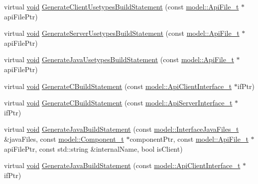 \begin{DoxyCompactItemize}
\item 
virtual \hyperlink{_t_e_m_p_l_a_t_e__cdef_8h_ac9c84fa68bbad002983e35ce3663c686}{void} \hyperlink{classninja_1_1_component_build_script_generator__t_a7f11f3f8ce13b373ea30b295c7c493f2}{Generate\+Client\+Usetypes\+Build\+Statement} (const \hyperlink{structmodel_1_1_api_file__t}{model\+::\+Api\+File\+\_\+t} $\ast$api\+File\+Ptr)
\item 
virtual \hyperlink{_t_e_m_p_l_a_t_e__cdef_8h_ac9c84fa68bbad002983e35ce3663c686}{void} \hyperlink{classninja_1_1_component_build_script_generator__t_a0fa0c9036a54a9bb08a2e18efdacd128}{Generate\+Server\+Usetypes\+Build\+Statement} (const \hyperlink{structmodel_1_1_api_file__t}{model\+::\+Api\+File\+\_\+t} $\ast$api\+File\+Ptr)
\item 
virtual \hyperlink{_t_e_m_p_l_a_t_e__cdef_8h_ac9c84fa68bbad002983e35ce3663c686}{void} \hyperlink{classninja_1_1_component_build_script_generator__t_a1a43aaf9c77e4eee267c852f0456fb3a}{Generate\+Java\+Usetypes\+Build\+Statement} (const \hyperlink{structmodel_1_1_api_file__t}{model\+::\+Api\+File\+\_\+t} $\ast$api\+File\+Ptr)
\item 
virtual \hyperlink{_t_e_m_p_l_a_t_e__cdef_8h_ac9c84fa68bbad002983e35ce3663c686}{void} \hyperlink{classninja_1_1_component_build_script_generator__t_af40b074f711ec1bbdb482d4a63e7c67a}{Generate\+C\+Build\+Statement} (const \hyperlink{structmodel_1_1_api_client_interface__t}{model\+::\+Api\+Client\+Interface\+\_\+t} $\ast$if\+Ptr)
\item 
virtual \hyperlink{_t_e_m_p_l_a_t_e__cdef_8h_ac9c84fa68bbad002983e35ce3663c686}{void} \hyperlink{classninja_1_1_component_build_script_generator__t_a4fc42cc4f097359dcca9b2c4b234c468}{Generate\+C\+Build\+Statement} (const \hyperlink{structmodel_1_1_api_server_interface__t}{model\+::\+Api\+Server\+Interface\+\_\+t} $\ast$if\+Ptr)
\item 
virtual \hyperlink{_t_e_m_p_l_a_t_e__cdef_8h_ac9c84fa68bbad002983e35ce3663c686}{void} \hyperlink{classninja_1_1_component_build_script_generator__t_a80c397c57bb045b0493abdb835a9d156}{Generate\+Java\+Build\+Statement} (const \hyperlink{structmodel_1_1_interface_java_files__t}{model\+::\+Interface\+Java\+Files\+\_\+t} \&java\+Files, const \hyperlink{structmodel_1_1_component__t}{model\+::\+Component\+\_\+t} $\ast$component\+Ptr, const \hyperlink{structmodel_1_1_api_file__t}{model\+::\+Api\+File\+\_\+t} $\ast$api\+File\+Ptr, const std\+::string \&internal\+Name, bool is\+Client)
\item 
virtual \hyperlink{_t_e_m_p_l_a_t_e__cdef_8h_ac9c84fa68bbad002983e35ce3663c686}{void} \hyperlink{classninja_1_1_component_build_script_generator__t_afcf20ce5ad6a1c78e882e5590f48b277}{Generate\+Java\+Build\+Statement} (const \hyperlink{structmodel_1_1_api_client_interface__t}{model\+::\+Api\+Client\+Interface\+\_\+t} $\ast$if\+Ptr)

\end{DoxyCompactItemize}
